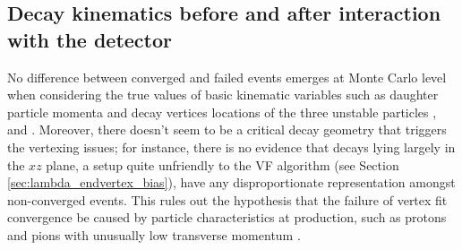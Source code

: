 %
%
%


\subsection{Decay kinematics before and after interaction with the detector}
\label{sec:3:kinematics_at_first_meas}
No difference between converged and failed \demonstratorshort events emerges at Monte Carlo level when considering the true values of basic kinematic variables such as daughter particle momenta and decay vertices locations of the three unstable particles \lbz, \lz and \jpsi.
Moreover, there doesn't seem to be a critical decay geometry that triggers the vertexing issues;
for instance, there is no evidence that \lambdadecay decays lying largely in the $xz$ plane, a setup quite unfriendly to the VF algorithm (see Section \ref{sec:lambda_endvertex_bias}), have any disproportionate representation amongst non-converged events.
This rules out the hypothesis that the failure of vertex fit convergence be caused by particle characteristics at production, such as protons and pions with unusually low transverse momentum \pt.

